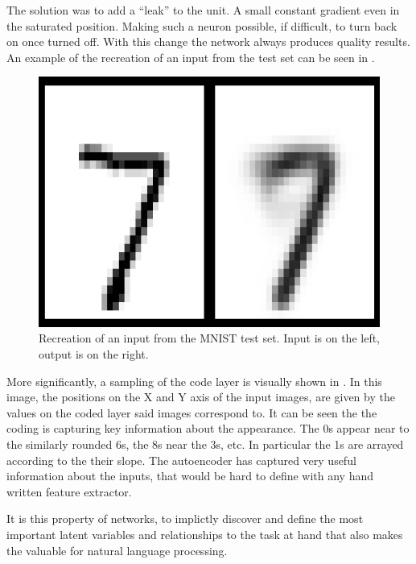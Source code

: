 \documentclass[12pt,parskip]{komatufte}
\begin{document}
The solution was to add a ``leak'' to the unit.
A small constant gradient even in the saturated position.
Making such a neuron possible, if difficult, to turn back on once turned off.
With this change the network always produces quality results.
An example of the recreation of an input from the test set can be seen in 
.


\begin{figure}
	\caption{Recreation of an input from the MNIST test set. Input is on the left, output is on the right.}
	\label{fig-ae-recreation}
	\includegraphics[scale= 0.30]{figs/chapterintromachinelearning/recreation}
\end{figure}


More significantly, a sampling of the code layer is visually shown in .
In this image, the positions on the X and Y axis of the input images, are given by the values on the coded layer said images correspond to.
It can be seen the the coding is capturing key information about the appearance.
The 0s appear near to the similarly rounded 6s,
the 8s near the 3s, etc.
In particular the 1s are arrayed according to the their slope.
The autoencoder has captured very useful information about the inputs, that would be hard to define with any hand written feature extractor.

It is this property of networks, to implictly discover and define the most important latent variables and relationships to the task at hand that also makes the valuable for natural language processing.
\end{document}
